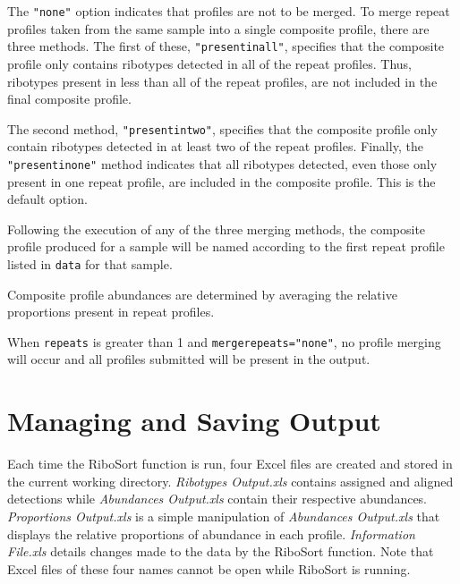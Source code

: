 \documentclass[a4paper]{article}
\begin{document}
\begin{description}
The \texttt{"none"} option indicates that profiles are not to be merged. To merge repeat profiles taken from the same sample into a single composite profile, there are three methods. The first of these, \texttt{"presentinall"}, specifies that the composite profile only contains ribotypes detected in all of the repeat profiles. Thus, ribotypes present in less than all of the repeat profiles, are not included in the final composite profile. 

The second method, \texttt{"presentintwo"}, specifies that the composite profile only contain ribotypes detected in at least two of the repeat profiles. Finally, the \texttt{"presentinone"} method indicates that all ribotypes detected, even those only present in one repeat profile, are included in the composite profile. This is the default option.

Following the execution of any of the three merging methods, the composite profile produced for a sample will be named according to the first repeat profile listed in \texttt{data} for that sample.

Composite profile abundances are determined by averaging the relative proportions present in repeat profiles.

When \texttt{repeats} is greater than 1 and  \texttt{mergerepeats="none"}, no profile merging will occur and all profiles submitted will be present in the output.

\end{description}

\section{Managing and Saving Output}
Each time the RiboSort function is run, four Excel files are created and stored in the current working directory. {\em Ribotypes Output.xls} contains assigned and aligned detections while {\em Abundances Output.xls}  contain their respective abundances. {\em Proportions Output.xls} is a simple manipulation of {\em Abundances Output.xls} that displays the relative proportions of abundance in each profile. {\em Information File.xls} details changes made to the data by the RiboSort function. Note that Excel files of these four names cannot be open while RiboSort is running.
\end{document}
